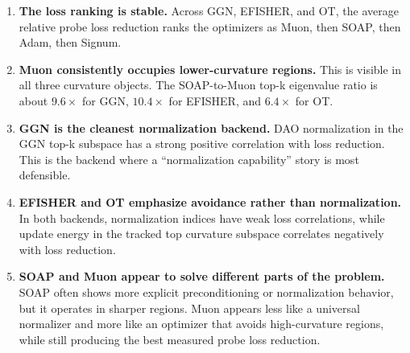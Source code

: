 \documentclass[11pt]{article}
\begin{document}
\begin{enumerate}
    \item \textbf{The loss ranking is stable.} Across GGN, EFISHER, and OT, the
    average relative probe loss reduction ranks the optimizers as
    Muon, then SOAP, then Adam, then Signum.

    \item \textbf{Muon consistently occupies lower-curvature regions.} This is
    visible in all three curvature objects. The SOAP-to-Muon top-k eigenvalue
    ratio is about $9.6\times$ for GGN, $10.4\times$ for EFISHER, and
    $6.4\times$ for OT.

    \item \textbf{GGN is the cleanest normalization backend.} DAO normalization
    in the GGN top-k subspace has a strong positive correlation with loss
    reduction. This is the backend where a ``normalization capability'' story
    is most defensible.

    \item \textbf{EFISHER and OT emphasize avoidance rather than normalization.}
    In both backends, normalization indices have weak loss correlations, while
    update energy in the tracked top curvature subspace correlates negatively
    with loss reduction.

    \item \textbf{SOAP and Muon appear to solve different parts of the problem.}
    SOAP often shows more explicit preconditioning or normalization behavior,
    but it operates in sharper regions. Muon appears less like a universal
    normalizer and more like an optimizer that avoids high-curvature regions,
    while still producing the best measured probe loss reduction.
\end{enumerate}
\end{document}
